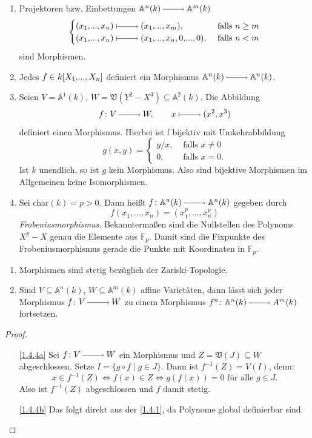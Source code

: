 \documentclass[a4paper,12pt]{scrbook}
\newtheorem{proof}{Beweis}
\def\A{\mathbb{A}}
\def\V{\mathfrak{V}}
\newcommand{\FF}{\mathbb{F}}
\renewcommand{\dotsc}{\ensuremath{\!...}}
\newcommand{\ra}{\raisebox{-1pt}{\tikz{\draw[thin,shorten >=3pt, ->] (0,0) node{\hspace*{-2pt}} -- node{} (1,0);}}\penalty1000\relax}
\renewcommand{\mapsto}{\raisebox{-1pt}{\tikz{\draw[thin,shorten >=3pt, |->] (0,0) node{\hspace*{0pt}} -- node{} (1,0);}}\penalty1000\relax}
\newcommand{\polyx}[1][n]{\ensuremath%
  [X_{1},\dotsc,X_{#1}]}
\begin{document}
\begin{bsp}\label{1.4.3}
\begin{enumerate}
\item{}  Projektoren bzw. Einbettungen $\A^{n}(k)\ra \A^{m}(k)$ 
\[\begin{cases} (x_1,\dotsc,x_n) \mapsto (x_1,\dotsc,x_m),&\text{ falls }n\ge m \\ (x_1,\dotsc,x_n)\mapsto (x_1,\dotsc,x_n,0,\dotsc,0),&\text{ falls }n<m \end{cases}\] sind Morphismen.
\item{} Jedes $f \in k\polyx$ definiert ein Morphismus $\A^{n}(k)\ra \A^{n}(k)$.
\item{} Seien $V=\A^1(k)$, $W=\V(Y^2-X^3) \subseteq \A^2(k)$. Die Abbildung 
\[f\colon V\ra W, \qquad x\mapsto (x^2,x^3)\]
definiert einen Morphismus.
Hierbei ist f bijektiv mit Umkehrabbildung 
\[g(x,y)=\begin{cases} y/x,&\text{ falls }x\neq 0 \\ 0,&\text{ falls }x=0. \end{cases}\]
Ist $k$ unendlich, so ist $g$ kein Morphismus. Also sind bijektive Morphismen im Allgemeinen keine Isomorphismen.
\item{} Sei char$(k)=p>0$. Dann heißt $f\colon \A^n(k)\ra \A^n(k)$ gegeben durch 
\[f(x_1,\dotsc,x_n)=(x_1^p,\dotsc,x_n^p)\] 
\emph{Frobeniusmorphismus}. Bekanntermaßen sind die Nullstellen des Polynoms $X^{p}-X$ genau die Elemente aus $\FF_p$. Damit sind die Fixpunkte des Frobeniusmorphismus gerade die Punkte mit Koordinaten in $\FF_p$.
\end{enumerate}
\end{bsp}

\begin{bem}\label{1.4.4}
\begin{enumerate}
\item{} Morphismen sind stetig bezüglich der Zariski-Topologie.
\item{} Sind $V\subseteq \A^n(k)$, $W \subseteq \A^m(k)$ affine Varietäten, dann lässt sich jeder Morphismus $f\colon V\ra W$ zu einem Morphismus $f^n\colon \A^n(k)\ra A^m(k)$ fortsetzen.
\end{enumerate}
\end{bem}

\begin{proof}
\begin{enumerate}
\item[\ref{1.4.4a}] Sei $f\colon V\ra W$ ein Morphismus und $Z=\V(J)\subseteq W$ abgeschlossen. Setze $I=\{g\circ f \mid g\in J\}$. Dann ist $f^{-1}(Z)=V(I)$, denn: 
\[x\in f^{-1}(Z)\iff f(x)\in Z \iff g(f(x))=0\text{ für alle }g\in J.\]
Also ist $f^{-1}(Z)$ abgeschlossen und $f$ damit stetig.
\item[\ref{1.4.4b}] Das folgt direkt aus der \cref{1.4.1}, da Polynome global definierbar sind.
\end{enumerate}
\end{proof}
\end{document}
